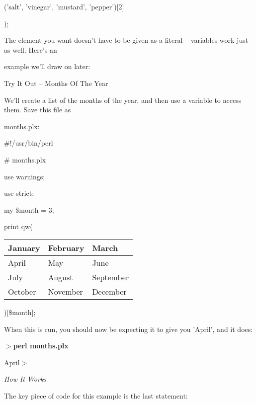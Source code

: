 \documentclass[a4paper,11pt]{book}
\begin{document}
\noindent ('salt', 'vinegar', 'mustard', 'pepper')[2]

\noindent );

\noindent 

\noindent 

\noindent The element you want doesn't have to be given as a literal -- variables work just as well. Here's an

\noindent example we'll draw on later:

\noindent 

\noindent Try It Out -- Months Of The Year

\noindent We'll create a list of the months of the year, and then use a variable to access them. Save this file as

\noindent months.plx:

\noindent 

\noindent 

\noindent \#!/usr/bin/perl

\noindent \# months.plx

\noindent use warnings;

\noindent use strict;

\noindent 

\noindent my \$month = 3;

\noindent print qw(

\begin{tabular}{|p{1.1in}|p{0.6in}|p{2.5in}|} \hline 
January & February & March \\ \hline 
April & May & June \\ \hline 
July & August & September \\ \hline 
October & November & December \\ \hline 
\end{tabular}

)[\$month];

\noindent 

\noindent When this is run, you should now be expecting it to give you 'April', and it does:

\noindent 

\noindent $>$\textbf{perl months.plx}

\noindent April$>$

\noindent 

\noindent \textit{How It Works}

\noindent The key piece of code for this example is the last statement:

\noindent 
\end{document}
